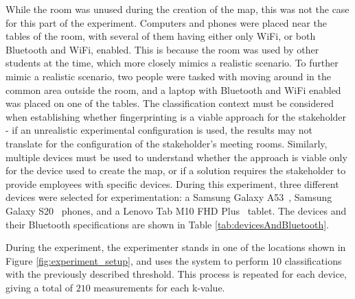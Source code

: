 While the room was unused during the creation of the map, this was not the case for this part of the experiment.
Computers and phones were placed near the tables of the room, with several of them having either only WiFi, or both Bluetooth and WiFi, enabled. 
This is because the room was used by other students at the time, which more closely mimics a realistic scenario.
To further mimic a realistic scenario, two people were tasked with moving around in the common area outside the room, and a laptop with Bluetooth and WiFi enabled was placed on one of the tables.
The classification context must be considered when establishing whether fingerprinting is a viable approach for the stakeholder - if an unrealistic experimental configuration is used, the results may not translate for the configuration of the stakeholder's meeting rooms. 
Similarly, multiple devices must be used to understand whether the approach is viable only for the device used to create the map, or if a solution requires the stakeholder to provide employees with specific devices. 
During this experiment, three different devices were selected for experimentation: a Samsung Galaxy A53~\cite{a53phone}, Samsung Galaxy S20~\cite{galaxy20phone} phones, and a Lenovo Tab M10 FHD Plus~\cite{tablet} tablet. 
The devices and their Bluetooth specifications are shown in Table \ref{tab:devicesAndBluetooth}.

\begin{table}[h!]
    \caption{The devices used in during classification and their supported Bluetooth version.}
    \label{tab:devicesAndBluetooth}
\end{table}

During the experiment, the experimenter stands in one of the locations shown in Figure \ref{fig:experiment_setup}, and uses the system to perform $10$ classifications with the previously described threshold.
This process is repeated for each device, giving a total of $210$ measurements for each k-value.